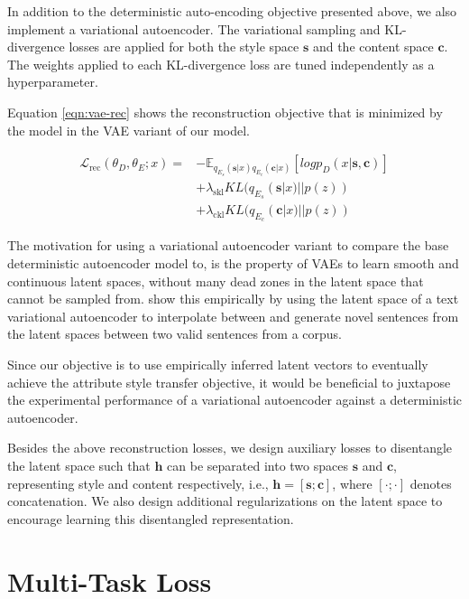 In addition to the deterministic auto-encoding objective presented above, we also implement a variational autoencoder. The variational sampling and KL-divergence losses are applied for both the style space $\bm s$ and the content space $\bm c$. The weights applied to each KL-divergence loss are tuned independently as a hyperparameter.

Equation \ref{eqn:vae-rec} shows the reconstruction objective that is minimized by the model in the VAE variant of our model.

\begin{align} \label{eqn:vae-rec}
	\mathcal{L}_\text{rec}(\theta_D, \theta_E; x) = \nonumber
	 & - \mathbb{E}_{q_{E_s}(\bm s|x) q_{E_c}(\bm c|x)} [log p_D(x|\bm s, \bm c)] \nonumber \\
	 & + \lambda_{\text{skl}} KL(q_{E_s}(\bm s|x)||p(z)) \nonumber                          \\
	 & + \lambda_{\text{ckl}} KL(q_{E_c}(\bm c|x)||p(z))
\end{align}

The motivation for using a variational autoencoder variant to compare the base deterministic autoencoder model to, is the property of VAEs to learn smooth and continuous latent spaces, without many dead zones in the latent space that cannot be sampled from. \cite{bowman2016generating} show this empirically by using the latent space of a text variational autoencoder to interpolate between and generate novel sentences from the latent spaces between two valid sentences from a corpus.

Since our objective is to use empirically inferred latent vectors to eventually achieve the attribute style transfer objective, it would be beneficial to juxtapose the experimental performance of a variational autoencoder against a deterministic autoencoder.


Besides the above reconstruction losses, we design auxiliary losses to disentangle the latent space such that $\bm h$ can be separated into two spaces $\bm s$ and $\bm c$, representing style and content respectively, i.e., $\bm h = [\bm s ; \bm c]$, where $[\cdot;\cdot]$ denotes concatenation. We also design additional regularizations on the latent space to encourage learning this disentangled representation.


\section{Multi-Task Loss} \label{ssec:multitask-objective}

